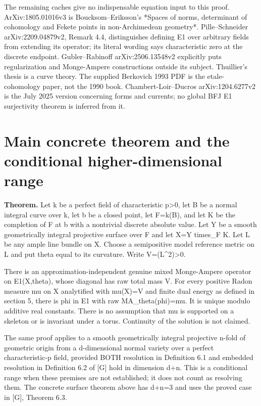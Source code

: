 \documentclass[11pt]{article}
\begin{document}
The remaining caches give no indispensable equation input to this proof. ArXiv:1805.01016v3 is Boucksom--Eriksson's *Spaces of norms, determinant of cohomology and Fekete points in non-Archimedean geometry*. Pille--Schneider arXiv:2209.04879v2, Remark 4.4, distinguishes defining E1 over arbitrary fields from extending its operator; its literal wording says characteristic zero at the discrete endpoint. Gubler--Rabinoff arXiv:2506.13548v2 explicitly puts regularization and Monge-Ampere constructions outside its subject. Thuillier's thesis is a curve theory. The supplied Berkovich 1993 PDF is the etale-cohomology paper, not the 1990 book. Chambert-Loir--Ducros arXiv:1204.6277v2 is the July 2025 version concerning forms and currents; no global BFJ E1 surjectivity theorem is inferred from it.

\section{Main concrete theorem and the conditional higher-dimensional range}

\textbf{Theorem.} Let k be a perfect field of characteristic p\textgreater{}0, let B be a normal integral curve over k, let b be a closed point, let F=k(B), and let K be the completion of F at b with a nontrivial discrete absolute value. Let Y be a smooth geometrically integral projective surface over F and let X=Y times\_F K. Let L be any ample line bundle on X. Choose a semipositive model reference metric on L and put theta equal to its curvature. Write V=(L\textasciicircum{}2)\textgreater{}0.

There is an approximation-independent genuine mixed Monge-Ampere operator on E1(X,theta), whose diagonal has raw total mass V. For every positive Radon measure mu on X analytified with mu(X)=V and finite dual energy as defined in section 5, there is phi in E1 with raw MA\_theta(phi)=mu. It is unique modulo additive real constants. There is no assumption that mu is supported on a skeleton or is invariant under a torus. Continuity of the solution is not claimed.

The same proof applies to a smooth geometrically integral projective n-fold of geometric origin from a d-dimensional normal variety over a perfect characteristic-p field, provided BOTH resolution in Definition 6.1 and embedded resolution in Definition 6.2 of [G] hold in dimension d+n. This is a conditional range when these premises are not established; it does not count as resolving them. The concrete surface theorem above has d+n=3 and uses the proved case in [G], Theorem 6.3.
\end{document}
